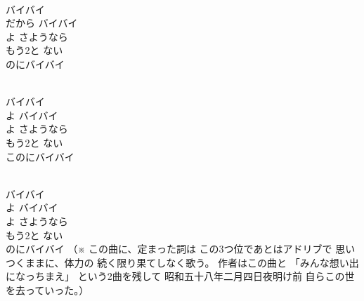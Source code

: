 \documentclass[10pt,b5j]{tarticle} %
\begin{document}
\vspace{1.5em} %
\newcommand{\linespace}{0.5em} %
\newcommand{\blocksize}{0.5\hsize} %
\newcommand{\itemmargin}{3em} %
\begin{enumerate} %
    \setlength{\itemindent}{\itemmargin} %
    \begin{minipage}[c]{\blocksize}
    
        \vspace{\linespace}
        \item~\\
        バイバイ\\
        だから バイバイ\\
        よ さようなら\\
        もう2と ない\\
        のにバイバイ
        
    \end{minipage}
    \begin{minipage}[c]{\blocksize}
        
        \vspace{\linespace}
        \item~\\
        バイバイ\\
        よ バイバイ\\
        よ さようなら\\
        もう2と ない\\
        このにバイバイ
        
    \end{minipage}
    \begin{minipage}[c]{\blocksize}
        
        \vspace{\linespace}
        \item~\\
        バイバイ\\
        よ バイバイ\\
        よ さようなら\\
        もう2と ない\\
        のにバイバイ
        （※
        この曲に、定まった詞は
        この3つ位であとはアドリブで
        思いつくままに、体力の
        続く限り果てしなく歌う。
        作者はこの曲と
        「みんな想い出になっちまえ」
        という2曲を残して
        昭和五十八年二月四日夜明け前
        自らこの世を去っていった。）
    
    \end{minipage}
\end{enumerate} %
\end{document}
